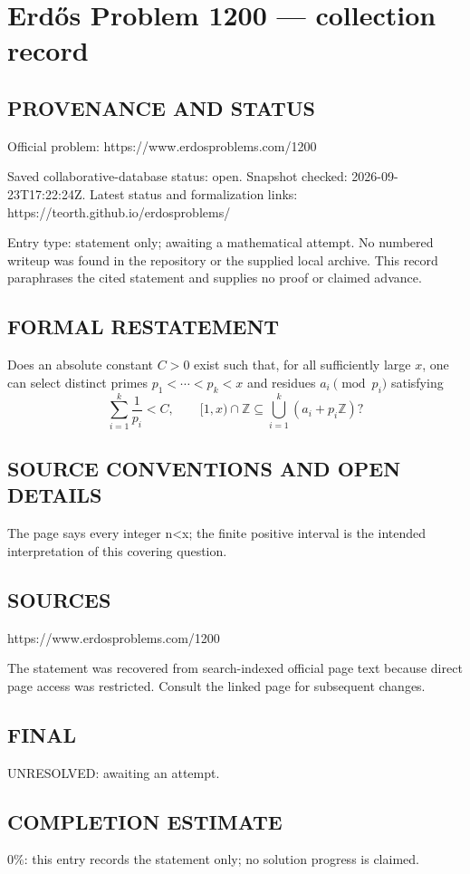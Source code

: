 \section*{Erd\H{o}s Problem 1200 --- collection record}

\subsection*{PROVENANCE AND STATUS}
Official problem: https://www.erdosproblems.com/1200

Saved collaborative-database status: open.
Snapshot checked: 2026-09-23T17:22:24Z.
Latest status and formalization links: https://teorth.github.io/erdosproblems/

Entry type: statement only; awaiting a mathematical attempt. No numbered writeup was found in the repository or the supplied local archive. This record paraphrases the cited statement and supplies no proof or claimed advance.

\subsection*{FORMAL RESTATEMENT}
Does an absolute constant $C>0$ exist such that, for all sufficiently large $x$, one can select distinct primes $p_1<\cdots<p_k<x$ and residues $a_i\pmod{p_i}$ satisfying
\[\sum_{i=1}^k\frac1{p_i}<C,\qquad
[1,x)\cap\mathbb Z\subseteq\bigcup_{i=1}^k(a_i+p_i\mathbb Z)?\]

\subsection*{SOURCE CONVENTIONS AND OPEN DETAILS}
The page says every integer n<x; the finite positive interval is the intended interpretation of this covering question.

\subsection*{SOURCES}
https://www.erdosproblems.com/1200

The statement was recovered from search-indexed official page text because direct page access was restricted. Consult the linked page for subsequent changes.

\subsection*{FINAL}
UNRESOLVED: awaiting an attempt.

\subsection*{COMPLETION ESTIMATE}
$0\%$: this entry records the statement only; no solution progress is claimed.
